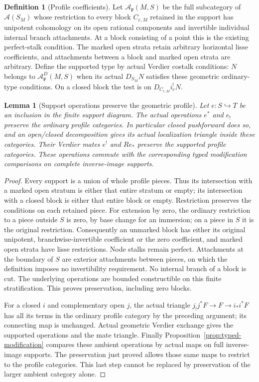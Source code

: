 \documentclass[11pt]{article}
\newtheorem{lemma}[theorem]{Lemma}
\theoremstyle{definition}
\newtheorem{definition}[theorem]{Definition}
\theoremstyle{remark}
\begin{document}
\begin{definition}[Profile coefficients]
\label{def:profile-coefficients}
Let $\mathcal A_{\mathfrak p}(M,S)$ be the full subcategory of
$\mathcal A(S_M)$ whose restriction to every block $C_{e,M}$ retained
in the support has unipotent cohomology on its open rational
components and invertible individual internal branch attachments.
At a block consisting of a point this is the existing perfect-stalk
condition.  The marked open strata retain arbitrary horizontal
lisse coefficients, and attachments between a block and marked
open strata are arbitrary.
Define the supported type by actual Verdier costalk conditions:
$N$ belongs to $\mathcal A_{\mathfrak p}^D(M,S)$ when its actual
$D_{S_M}N$ satisfies these geometric ordinary-type conditions.
On a closed block the test is on $D_{C_{e,M}}i_{e}^!N$.
\end{definition}

\begin{lemma}[Support operations preserve the geometric profile]
\label{lem:profile-support-closure}
Let $e:S\hookrightarrow T$ be an inclusion in the finite support
diagram. The actual operations $e^*$ and $e_!$ preserve the ordinary
profile categories. In particular closed pushforward does so, and
an open/closed decomposition gives its actual localization triangle
inside these categories. Their Verdier mates $e^!$ and $Re_*$
preserve the supported profile categories.
These operations commute with the corresponding typed modification
comparisons on complete inverse-image supports.
\end{lemma}
\begin{proof}
Every support is a union of whole profile pieces. Thus its
intersection with a marked open stratum is either that entire
stratum or empty; its intersection with a closed block is either
that entire block or empty. Restriction preserves the conditions
on each retained piece. For extension by zero, the ordinary
restriction to a piece outside $S$ is zero, by base change for an
immersion; on a piece in $S$ it is the original restriction.
Consequently an unmarked block has either its original unipotent,
branchwise-invertible coefficient or the zero coefficient, and
marked open strata have lisse restrictions. Node stalks remain
perfect. Attachments at the boundary of $S$ are exterior
attachments between pieces, on which the definition imposes no
invertibility requirement. No internal branch of a block is cut.
The underlying operations are bounded constructible on this finite
stratification. This proves preservation, including zero blocks.

For a closed $i$ and complementary open $j$, the actual triangle
$j_!j^*F\to F\to i_*i^*F$ has all its terms in the ordinary profile
category by the preceding argument; its connecting map is unchanged.
Actual geometric Verdier exchange gives the supported operations
and the mate triangle. Finally Proposition~\ref{prop:typed-modification}
compares these ambient operations by actual maps on full inverse-image
supports. The preservation just proved allows those same maps to
restrict to the profile categories. This last step cannot be replaced
by preservation of the larger ambient category alone.
\end{proof}
\end{document}
